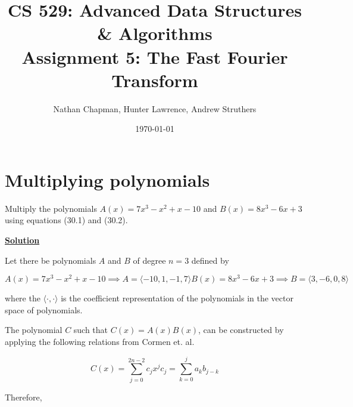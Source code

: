 \documentclass{article}
\title{\vspace*{-0.625in}CS 529: Advanced Data Structures \& Algorithms \\ Assignment 5: The Fast Fourier Transform}
\author{Nathan Chapman, Hunter Lawrence, Andrew Struthers}
\date{\today}
\renewcommand{\_}{\ifincsname_\else\legacyunderscore\fi}
\begin{document}
    \maketitle

    \section*{Multiplying polynomials}

        Multiply the polynomials $A(x) = 7 x^3 - x^2 + x - 10$ and $B(x) = 8x^3 - 6x + 3$ using equations (30.1) and (30.2).

        \underline{\textbf{Solution}}

        Let there be polynomials $A$ and $B$ of degree $n = 3$ defined by 

        \begin{subequations}
            \begin{equation}
                A(x) = 7 x^3 - x^2 + x - 10 \implies A = \langle -10, 1, -1, 7 \rangle
            \end{equation}
            \begin{equation}
                B(x) = 8x^3 - 6x + 3 \implies B = \langle 3, -6, 0, 8\rangle
            \end{equation}
        \end{subequations}

        where the $\langle \cdot, \cdot \rangle$ is the coefficient representation of the polynomials in the vector space of polynomials.

        The polynomial $C$ such that $C(x) = A(x)B(x)$, can be constructed by applying the following relations from Cormen et. al. 

        \begin{subequations}
            \begin{equation}
                C(x) = \sum_{j = 0}^{2n - 2} c_j x^j
            \end{equation}
            \begin{equation}
                c_j = \sum_{k = 0}^{j} a_k b_{j - k}
            \end{equation}
        \end{subequations}

        Therefore,
\end{document}
